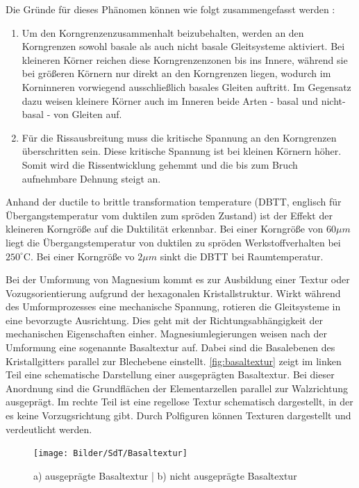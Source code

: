 Die Gründe für dieses Phänomen können wie folgt zusammengefasst werden \cite{NarayanaMurty.2015}:
\begin{enumerate}
    \item Um den Korngrenzenzusammenhalt beizubehalten, werden an den Korngrenzen sowohl basale als auch nicht basale Gleitsysteme aktiviert.
    Bei kleineren Körner reichen diese Korngrenzenzonen bis ins Innere, während sie bei größeren Körnern nur direkt an den Korngrenzen liegen, wodurch im Korninneren vorwiegend ausschließlich basales Gleiten auftritt.
    Im Gegensatz dazu weisen kleinere Körner auch im Inneren beide Arten - basal und nicht-basal - von Gleiten auf.
    \item Für die Rissausbreitung muss die kritische Spannung an den Korngrenzen überschritten sein.
    Diese kritische Spannung ist bei kleinen Körnern höher.
    Somit wird die Rissentwicklung gehemmt und die bis zum Bruch aufnehmbare Dehnung steigt an.
\end{enumerate}

Anhand der ductile to brittle transformation temperature (DBTT, englisch für Übergangstemperatur vom duktilen zum spröden Zustand) ist der Effekt der kleineren Korngröße auf die Duktilität erkennbar.
Bei einer Korngröße von $60 \mu m$ liegt die Übergangstemperatur von duktilen zu spröden Werkstoffverhalten bei $250^\circ\text{C}$.
Bei einer Korngröße vo $2\mu m$ sinkt die DBTT bei Raumtemperatur. \cite{NarayanaMurty.2015}

Bei der Umformung von Magnesium kommt es zur Ausbildung einer Textur oder Vozugsorientierung aufgrund der hexagonalen Kristallstruktur.
Wirkt während des Umformprozesses eine mechanische Spannung, rotieren die Gleitsysteme in eine bevorzugte Ausrichtung.
Dies geht mit der Richtungsabhängigkeit der mechanischen Eigenschaften einher.
Magnesiumlegierungen weisen nach der Umformung eine sogenannte Basaltextur auf.
Dabei sind die Basalebenen des Kristallgitters parallel zur Blechebene einstellt. \cite{Styczynski.2004,Jeong.2007}
\autoref{fig:basaltextur} zeigt im linken Teil eine schematische Darstellung einer ausgeprägten Basaltextur.
Bei dieser Anordnung sind die Grundflächen der Elementarzellen parallel zur Walzrichtung ausgeprägt.
Im rechte Teil ist eine regellose Textur schematisch dargestellt, in der es keine Vorzugsrichtung gibt.
Durch Polfiguren können Texturen dargestellt und verdeutlicht werden.

\begin{figure}[H]%
    \centering
    \texttt{[image: Bilder/SdT/Basaltextur]}
    \caption[Ausgeprägte und nicht ausgeprägte Basaltextur]{a) ausgeprägte Basaltextur | b) nicht ausgeprägte Basaltextur \cite{Ullmann.2019}}
    \label{fig:basaltextur}
\end{figure}

